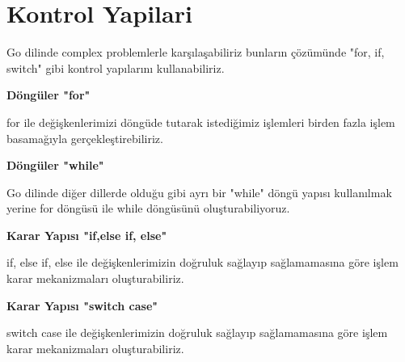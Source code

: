 \section{Kontrol Yapilari}
\vspace{5mm}

Go dilinde complex problemlerle karşılaşabiliriz bunların çözümünde "for, if, switch" gibi kontrol yapılarını kullanabiliriz. 

\vspace{20mm}


\textbf{Döngüler "for"}
\vspace{7mm}

for ile değişkenlerimizi döngüde tutarak istediğimiz işlemleri birden fazla işlem basamağıyla gerçekleştirebiliriz.
\vspace{5mm}



\vspace{10mm}
\textbf{Döngüler "while"}
\vspace{5mm}

Go dilinde diğer dillerde olduğu gibi ayrı bir "while" döngü yapısı kullanılmak yerine for döngüsü ile while döngüsünü oluşturabiliyoruz.
\vspace{5mm}



\vspace{10mm}
\textbf{Karar Yapısı "if,else if, else"}
\vspace{5mm}

if, else if, else ile değişkenlerimizin doğruluk sağlayıp sağlamamasına göre işlem karar mekanizmaları oluşturabiliriz.
\vspace{5mm}



\vspace{10mm}
\textbf{Karar Yapısı "switch case"}
\vspace{5mm}

switch case ile değişkenlerimizin doğruluk sağlayıp sağlamamasına göre işlem karar mekanizmaları oluşturabiliriz.
\vspace{5mm}




